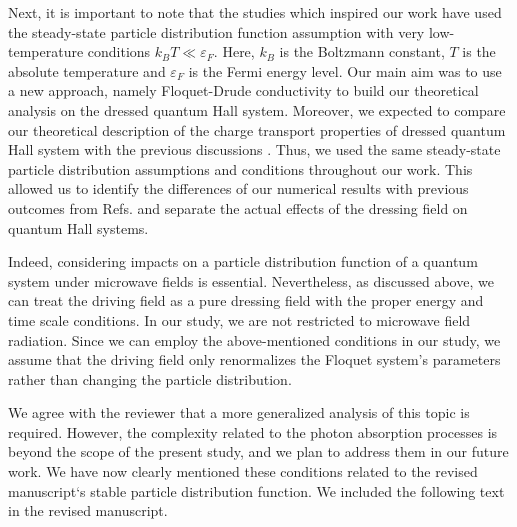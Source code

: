 \documentclass{article}
\begin{document}
Next, it is important to note that the studies \cite{wackerl20,wackerlthesis20,dini16,endo09} which inspired our work have  used the steady-state particle distribution function assumption with very low-temperature conditions $k_B T \ll \varepsilon_F$. Here, $k_B$ is the Boltzmann constant, $T$ is the absolute temperature and $\varepsilon_F$ is the Fermi energy level.
Our main aim was to use a new approach, namely Floquet-Drude conductivity \cite{wackerl20} to build our theoretical analysis on the dressed quantum Hall system.
Moreover, we expected to compare our theoretical description of the charge transport properties of dressed quantum Hall system with the previous discussions \cite{dini16,endo09}. Thus, we used the same steady-state particle distribution assumptions and conditions throughout our work.
This allowed us to identify the differences of our numerical results with previous outcomes from Refs. \cite{dini16,endo09} and separate the actual effects of the dressing field on quantum Hall systems.

Indeed, considering impacts on a particle distribution function of a quantum system under microwave fields is essential. Nevertheless, as discussed above, we can treat the driving field as a pure dressing field with the proper energy and time scale conditions. In our study, we are not restricted to microwave field radiation. Since we can employ the above-mentioned conditions in our study, we assume that the driving field only renormalizes the Floquet system's parameters rather than changing the particle distribution.

We agree with the reviewer that a more generalized analysis of this topic is required. However, the complexity related to the photon absorption processes is beyond the scope of the present study, and we plan to address them in our future work. We have now clearly mentioned these conditions related to the revised manuscript`s stable particle distribution function. We included the following text in the revised manuscript.
\end{document}

